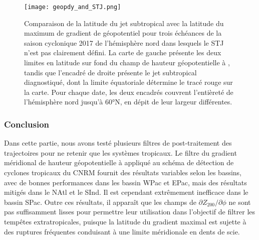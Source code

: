 \documentclass[../main.tex]{subfiles}
\begin{document}
\begin{figure}[tb]
    \centering
    \texttt{[image: geopdy\_and\_STJ.png]}
    \caption{Comparaison de la latitude du jet subtropical avec la latitude du maximum de gradient de géopotentiel pour trois échéances de la saison cyclonique
    2017 de l'hémisphère nord dans lesquels le STJ n'est pas clairement défini. La carte de gauche présente les deux limites en latitude sur fond du champ de
    hauteur géopotentielle à , tandis que l'encadré de droite présente le jet subtropical diagnostiqué, dont la limite équatoriale détermine le tracé rouge
    sur la carte. Pour chaque date, les deux encadrés couvrent l'entièreté de l'hémisphère nord jusqu'à \ang{60}N, en dépit de leur largeur différentes.}
    \label{fig:geopdy_and_STJ}
\end{figure}

\subsubsection*{Conclusion}

Dans cette partie, nous avons testé plusieurs filtres de post-traitement des trajectoires pour ne retenir que les systèmes tropicaux. Le filtre du gradient
méridional de hauteur géopotentielle à  appliqué au schéma de détection de cyclones tropicaux du CNRM fournit des résultats variables selon les
bassins, avec de bonnes performances dans les bassin WPac et EPac, mais des résultats mitigés dans le NAtl et le SInd. Il est cependant extrêmement inefficace
dans le bassin SPac. Outre ces résultats, il apparaît que les champs de $\partial Z_{200} / \partial \phi$ ne sont pas suffisamment lisses pour permettre leur
utilisation dans l'objectif de filtrer les tempêtes extratropicales, puisque la latitude du gradient maximal est sujette à des ruptures fréquentes conduisant à
une limite méridionale en dents de scie.
\end{document}
